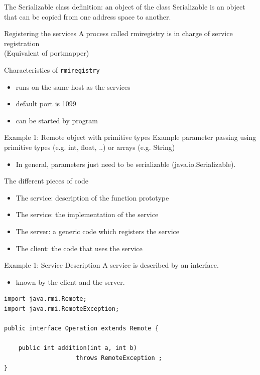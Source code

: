 \documentclass[bigger,hyperref={colorlinks=true, urlcolor=red, plainpages=false, pdfpagelabels, bookmarksnumbered}]{beamer}
\begin{document}
\begin{frame}[label=sec-3-5]{The Serializable class}
definition: an object of the class Serializable is an object
that can be copied from one address space to another.
\end{frame}

\begin{frame}[fragile,label=sec-3-6]{Registering the services}
 A process called \alert{rmiregistry} is in charge of service registration\\
   (Equivalent of portmapper)
\begin{block}{Characteristics of \texttt{rmiregistry}}
\begin{itemize}
\item runs on the same host as the services
\item default port is 1099
\item can be started by program
\end{itemize}
\end{block}
\end{frame}

\begin{frame}[label=sec-3-7]{Example 1: Remote object with primitive types}
Example parameter passing using primitive types (e.g. int, float, ..) or arrays (e.g. String) 
\begin{itemize}
\item In general, parameters just need to be \alert{serializable} (java.io.Serializable).
\end{itemize}
\begin{block}{The different pieces of code}
\begin{itemize}
\item The service: description of the function prototype
\item The service: the implementation of the service
\item The server: a generic code which registers the service
\item The client: the code that uses the service
\end{itemize}
\end{block}
\end{frame}

\begin{frame}[fragile,label=sec-3-8]{Example 1: Service Description}
 A service is described by an \alert{interface}.
\begin{itemize}
\item known by the client and the server.
\end{itemize}

\lstset{language=java,label= ,caption= ,numbers=none}
\begin{lstlisting}
import java.rmi.Remote;
import java.rmi.RemoteException;

public interface Operation extends Remote {

    public int addition(int a, int b) 
                    throws RemoteException ;
}
\end{lstlisting}
\end{frame}
\end{document}

